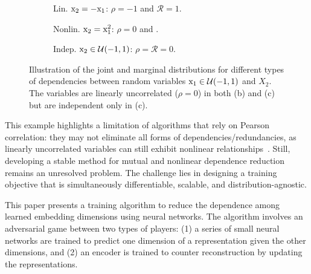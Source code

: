 \begin{figure*}
    \vspace{-8px}
    \centering
    \begin{subfigure}[t]{0.31\textwidth}  %
        \centering
        \def\svgwidth{120px}
        {\scriptsize }
        \vspace{0px}
        \caption{Lin. ${\textnormal{x}}_2=-{\textnormal{x}}_1$: $\rho = -1$ and $\mathcal{R} = 1$.}
    \end{subfigure}
    \hfill
    \begin{subfigure}[t]{0.35\textwidth}
        \centering
        \def\svgwidth{120px}
        {\scriptsize }
        \vspace{-0.5px}
        \caption{Nonlin. ${\textnormal{x}}_2={\textnormal{x}}_1^2$: $\rho = 0$ and .}
        \label{subfig:limitation_of_linear}
    \end{subfigure}
    \hfill
    \begin{subfigure}[t]{0.31\textwidth}
        \centering
        \def\svgwidth{120px}
        {\scriptsize }
        \vspace{0px}
        \caption{Indep. ${\textnormal{x}}_2 \in \mathcal{U}(-1,1)$: $\rho = \mathcal{R} = 0$.}
    \end{subfigure}
    \caption{Illustration of the joint and marginal distributions for different types of dependencies between random variables ${\textnormal{x}}_1 \in \mathcal{U}(-1,1)$ and $X_2$. The variables are linearly uncorrelated ($\rho = 0$) in both (b) and (c) but are independent only in (c).} %
    \label{fig:correlation_and_dependence_ex}
\end{figure*}
This example highlights a limitation of algorithms that rely on Pearson correlation: 
they may not eliminate all forms of dependencies/redundancies, as linearly uncorrelated variables can still exhibit nonlinear relationships~\citep{hyvarinen2000ICA_book}.  
Still, developing a stable method for mutual and nonlinear dependence reduction remains an unresolved problem. The challenge lies in designing a training objective that is simultaneously differentiable, scalable, and distribution-agnostic.

This paper presents a training algorithm to reduce the dependence among learned embedding dimensions using neural networks. 
The algorithm involves an adversarial game between two types of players: 
(1) a series of small neural networks are trained to predict one dimension of a representation given the other dimensions, and (2) an encoder is trained to counter reconstruction by updating the representations. 

